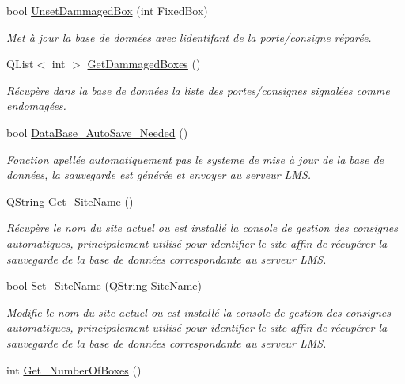 \begin{DoxyCompactItemize}
bool \hyperlink{class_c_s_q_lite___local___d_b_adac90874af0da1b1b71c96049f997a12}{Unset\+Dammaged\+Box} (int Fixed\+Box)
\begin{DoxyCompactList}\small\item\em Met à jour la base de données avec l\textquotesingle{}identifant de la porte/consigne réparée. \end{DoxyCompactList}\item 
Q\+List$<$ int $>$ \hyperlink{class_c_s_q_lite___local___d_b_af3122618d25c7f4cc3225ac15ec91958}{Get\+Dammaged\+Boxes} ()
\begin{DoxyCompactList}\small\item\em Récupère dans la base de données la liste des portes/consignes signalées comme endomagées. \end{DoxyCompactList}\item 
bool \hyperlink{class_c_s_q_lite___local___d_b_a3e2286f76a3334debdf2761ee285c17b}{Data\+Base\+\_\+\+Auto\+Save\+\_\+\+Needed} ()
\begin{DoxyCompactList}\small\item\em Fonction apellée automatiquement pas le systeme de mise à jour de la base de données, la sauvegarde est générée et envoyer au serveur L\+M\+S. \end{DoxyCompactList}\item 
Q\+String \hyperlink{class_c_s_q_lite___local___d_b_a3d92b3c5a71a60ef86315071268a62b8}{Get\+\_\+\+Site\+Name} ()
\begin{DoxyCompactList}\small\item\em Récupère le nom du site actuel ou est installé la console de gestion des consignes automatiques, principalement utilisé pour identifier le site affin de récupérer la sauvegarde de la base de données correspondante au serveur L\+M\+S. \end{DoxyCompactList}\item 
bool \hyperlink{class_c_s_q_lite___local___d_b_a166919fe85fb0cbb25efcb3a9cf8056d}{Set\+\_\+\+Site\+Name} (Q\+String Site\+Name)
\begin{DoxyCompactList}\small\item\em Modifie le nom du site actuel ou est installé la console de gestion des consignes automatiques, principalement utilisé pour identifier le site affin de récupérer la sauvegarde de la base de données correspondante au serveur L\+M\+S. \end{DoxyCompactList}\item 
int \hyperlink{class_c_s_q_lite___local___d_b_a26bcaa36108d9c5ef34a9ad11e288ad8}{Get\+\_\+\+Number\+Of\+Boxes} ()

\end{DoxyCompactItemize}
